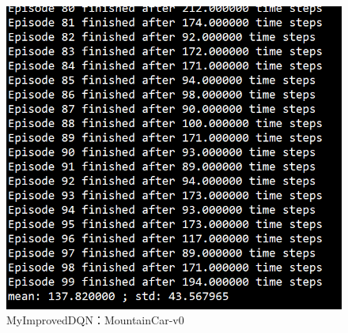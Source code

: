 \documentclass[a4paper,UTF8]{article}
\theoremstyle{definition}
\begin{document}
    \begin{center}
    \begin{figure}[H]
          \centering
          \includegraphics[width=12cm]{18.png}
          \caption{MyImprovedDQN：MountainCar-v0}
          \label{fig:2.3}
    \end{figure}
    \end{center}
\end{document}
